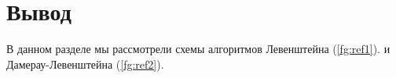 \begin{figure}[ht!]
\end{figure}

\section{Вывод}

В данном разделе мы рассмотрели схемы алгоритмов Левенштейна (\ref{fg:ref1}). и Дамерау-Левенштейна (\ref{fg:ref2}).







